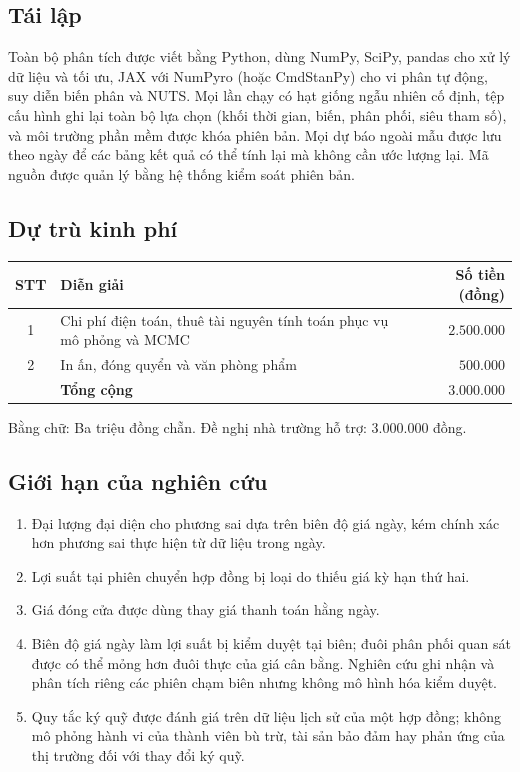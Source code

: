 \documentclass[12pt,a4paper]{article}
\theoremstyle{definition}
\theoremstyle{remark}
\begin{document}
\subsection{Tái lập}

Toàn bộ phân tích được viết bằng Python, dùng NumPy, SciPy, pandas cho xử lý dữ liệu và tối ưu, JAX với NumPyro (hoặc CmdStanPy) cho vi phân tự động, suy diễn biến phân và NUTS. Mọi lần chạy có hạt giống ngẫu nhiên cố định, tệp cấu hình ghi lại toàn bộ lựa chọn (khối thời gian, biến, phân phối, siêu tham số), và môi trường phần mềm được khóa phiên bản. Mọi dự báo ngoài mẫu được lưu theo ngày để các bảng kết quả có thể tính lại mà không cần ước lượng lại. Mã nguồn được quản lý bằng hệ thống kiểm soát phiên bản.

\subsection{Dự trù kinh phí}

\begin{table}[h]
\centering
\begin{tabular}{@{}cp{9.5cm}r@{}}
\toprule
\textbf{STT} & \textbf{Diễn giải} & \textbf{Số tiền (đồng)} \\
\midrule
1 & Chi phí điện toán, thuê tài nguyên tính toán phục vụ mô phỏng và MCMC & $2.500.000$ \\
2 & In ấn, đóng quyển và văn phòng phẩm & $500.000$ \\
\midrule
 & \textbf{Tổng cộng} & $\mathbf{3.000.000}$ \\
\bottomrule
\end{tabular}
\end{table}

\noindent Bằng chữ: Ba triệu đồng chẵn. Đề nghị nhà trường hỗ trợ: $3.000.000$ đồng.

\subsection{Giới hạn của nghiên cứu}

\begin{enumerate}
\item Đại lượng đại diện cho phương sai dựa trên biên độ giá ngày, kém chính xác hơn phương sai thực hiện từ dữ liệu trong ngày.
\item Lợi suất tại phiên chuyển hợp đồng bị loại do thiếu giá kỳ hạn thứ hai.
\item Giá đóng cửa được dùng thay giá thanh toán hằng ngày.
\item Biên độ giá ngày làm lợi suất bị kiểm duyệt tại biên; đuôi phân phối quan sát được có thể mỏng hơn đuôi thực của giá cân bằng. Nghiên cứu ghi nhận và phân tích riêng các phiên chạm biên nhưng không mô hình hóa kiểm duyệt.
\item Quy tắc ký quỹ được đánh giá trên dữ liệu lịch sử của một hợp đồng; không mô phỏng hành vi của thành viên bù trừ, tài sản bảo đảm hay phản ứng của thị trường đối với thay đổi ký quỹ.
\end{enumerate}
\end{document}
